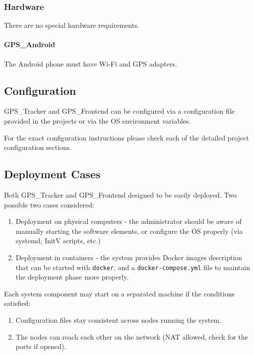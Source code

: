 \subsubsection{Hardware}\label{hardware}

There are no special hardware requirements.

\paragraph{GPS\_Android}\label{gps_android-hardware}

The Android phone must have Wi-Fi and GPS adapters.

\subsection{Configuration}\label{configuration}

GPS\_Tracker and GPS\_Frontend can be configured via a configuration
file provided in the projects or via the OS environment variables.

For the exact configuration instructions please check each of the
detailed project configuration sections.

\subsection{Deployment Cases}\label{deployment-cases}

Both GPS\_Tracker and GPS\_Frontend designed to be easily deployed.
Two possible two cases considered:

\begin{enumerate}
\def\labelenumi{\arabic{enumi}.}
\tightlist
\item
  Deployment on physical computers - the administrator should be aware of manually
  starting the software elements, or configure the OS properly (via
  systemd, InitV scripts, etc.)
\item
  Deployment in containers - the system provides Docker images
  description that can be started with \texttt{docker}, and a
  \texttt{docker-compose.yml} file to maintain the deployment phase more
  properly.
\end{enumerate}

Each system component may start on a separated machine if the conditions satisfied:

\begin{enumerate}
\def\labelenumi{\arabic{enumi}.}
\tightlist
\item
	Configuration files stay consistent across nodes running the system. 
\item
  	The nodes can reach each other on the network (NAT allowed, check for the ports if
  opened).
\end{enumerate}

